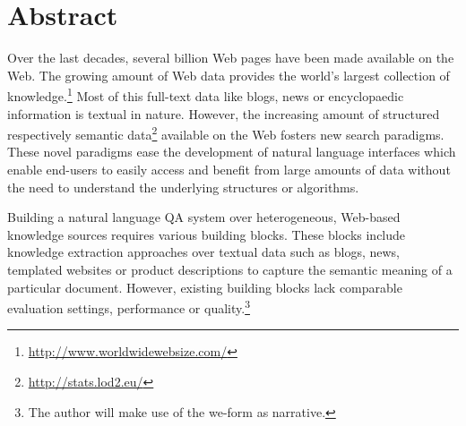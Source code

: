 \chapter*{Abstract}
Over the last decades, several billion Web pages have been made available on the Web. 
The growing amount of Web data provides the world's largest collection of knowledge.\footnote{\url{http://www.worldwidewebsize.com/}} 
Most of this full-text data like blogs, news or encyclopaedic information is textual in nature.
However, the increasing amount of structured respectively semantic data\footnote{\url{http://stats.lod2.eu/}} available on the Web fosters new search paradigms.
These novel paradigms ease the development of natural language interfaces which enable end-users to easily access and benefit from large amounts of data without the need to understand the underlying structures or algorithms.

Building a natural language \ac{QA} system over heterogeneous, Web-based knowledge sources requires various building blocks.
These blocks include knowledge extraction approaches over textual data such as blogs, news, templated websites or product descriptions to capture the semantic meaning of a particular document.
However, existing building blocks lack comparable evaluation settings, performance or quality.\footnote{The author will make use of the we-form as narrative.}


